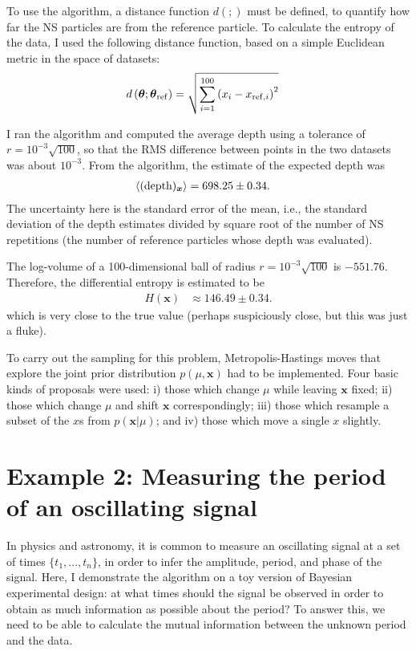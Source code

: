 \documentclass[entropy,article,accept,oneauthor,pdftex,10pt,a4paper]{mdpi}
\newcommand{\revision}{\color{darkblue}}
\newcommand{\x}{\boldsymbol{\theta}}
\newcommand{\depth}{(\textnormal{depth})}
\newcommand{\xref}{\x_{\rm ref}}
\begin{document}
To use the algorithm, a distance function $d(;)$ must be defined, to quantify
how far the NS particles are from the reference particle. To calculate
the entropy of the data, I used the following distance function,
{\revision based on
a simple Euclidean metric in the space of datasets:
\begin{align}
d\left(\x; \xref\right) &= \sqrt{
        \sum_{i=1}^{100}\left(x_i - x_{{\rm ref}, i}\right)^2}
\end{align}
}

I ran the algorithm and computed the average depth using a tolerance of
$r=10^{-3}\sqrt{100}$, so that the RMS difference between
points in the two datasets was about $10^{-3}$.
From the algorithm, the estimate of the expected depth was
\begin{align}
\left<\depth_{\boldsymbol{x}}\right> &= 698.25 \pm 0.34.
\end{align}
The uncertainty here is the standard error of the mean, i.e., the
standard deviation of the depth estimates divided by square root of
the number of NS repetitions {\revision (the number of reference particles
whose depth was evaluated)}.

The log-volume of a 100-dimensional ball of radius
$r=10^{-3}\sqrt{100}$ is
$-551.76$. Therefore, the differential entropy is estimated to be
\begin{align}
H(\boldsymbol{x}) &\approx 146.49 \pm 0.34.
\end{align}
which is very close to the true value (perhaps suspiciously close, but this
was just a fluke).

To carry out the sampling for this problem, Metropolis-Hastings moves that
explore the joint prior distribution $p(\mu, \boldsymbol{x})$ had to be
implemented. Four basic kinds of proposals were used: i) those which change
$\mu$ while leaving $\boldsymbol{x}$ fixed; ii) those which change $\mu$ and
shift $\boldsymbol{x}$ correspondingly; iii) those which resample a subset
of the $x$s from $p(\boldsymbol{x}|\mu)$; and iv) those which move a single
$x$ slightly.

\section{Example 2: Measuring the period of an oscillating signal}

In physics and astronomy, it is common to measure an oscillating signal
at a set of times $\{t_1, ..., t_n\}$, in order to infer the amplitude,
period, and phase of the signal.
Here, I demonstrate the algorithm on a toy version
of Bayesian experimental design: at what times should the signal be
observed in order to obtain as much information as possible about the
period? To answer this, we need to be able to calculate the mutual
information between the unknown period and the data.
\end{document}
